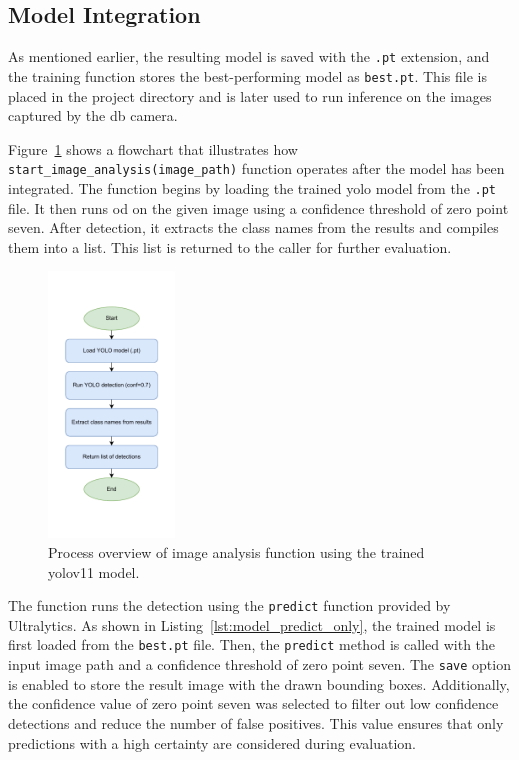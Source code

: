 \subsection{Model Integration}
As mentioned earlier, the resulting model is saved with the \texttt{.pt} extension, and the training function stores the best-performing model as \texttt{best.pt}. This file is placed in the project directory and is later used to run inference on the images captured by the \gls{db} camera.

Figure~\ref{run_image_analysis} shows a flowchart that illustrates how \texttt{start\_image\_analysis(image\_path)} function operates after the model has been integrated. The function begins by loading the trained \gls{yolo} model from the \texttt{.pt} file. It then runs \gls{od} on the given image using a confidence threshold of zero point seven. After detection, it extracts the class names from the results and compiles them into a list. This list is returned to the caller for further evaluation.

\begin{figure}[!ht]
    \centering
    \includegraphics[width=0.3\textwidth]{Figures/diagrams/run_image_analysis.pdf}
    \caption{Process overview of image analysis function using the trained \gls{yolo}v11 model.}
    \label{run_image_analysis}
\end{figure}

The function runs the detection using the \texttt{predict} function provided by Ultralytics. As shown in Listing~\ref{lst:model_predict_only}, the trained model is first loaded from the \texttt{best.pt} file. Then, the \texttt{predict} method is called with the input image path and a confidence threshold of zero point seven. The \texttt{save} option is enabled to store the result image with the drawn bounding boxes. Additionally, the confidence value of zero point seven was selected to filter out low confidence detections and reduce the number of false positives. This value ensures that only predictions with a high certainty are considered during evaluation.

